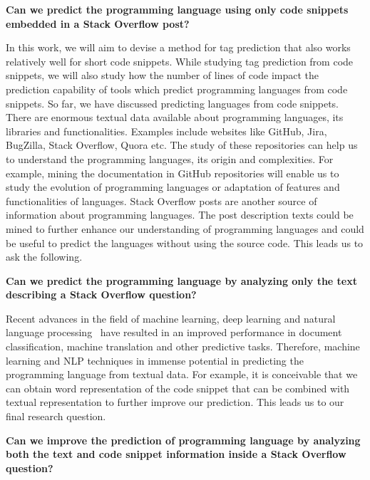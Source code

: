 \documentclass[letterpaper, 10 pt, conference]{ieeeconf}  %
\begin{document}
 
\begin{theo}
\textbf{Can we predict the programming language using only code snippets embedded in a Stack Overflow post?}
\end{theo}
 

In this work, we will aim to devise a method for tag prediction that also works relatively well for short code snippets. While studying tag prediction from code snippets, we will also study how the number of lines of code impact the prediction capability of tools which predict programming languages from code snippets. So far, we have discussed predicting languages from code snippets. There are enormous textual data available about programming languages, its libraries and functionalities. Examples include websites like GitHub, Jira, BugZilla, Stack Overflow, Quora etc. The study of these repositories can help us to understand the programming languages, its origin and complexities. For example, mining the documentation in GitHub repositories will enable us to study the evolution of programming languages or adaptation of features and functionalities of languages. Stack Overflow posts are another source of information about programming languages. The post description texts could be mined to further enhance our understanding of programming languages and could be useful to predict the languages without using the source code. This leads us to ask the following.

 
\begin{theo}
\textbf{Can we predict the programming language by analyzing only the text describing a Stack Overflow question?}
\end{theo}
 

Recent advances in the field of machine learning, deep learning and natural language processing~\cite{c13} have resulted in an improved performance in document classification, machine translation and other predictive tasks. Therefore, machine learning and NLP techniques in immense potential in predicting the programming language from textual data. For example, it is conceivable that we can obtain word representation of the code snippet that can be combined with textual representation to further improve our prediction. This leads us to our final research question.

 
\begin{theo}
\textbf{Can we improve the prediction of programming language by analyzing both the text and code snippet information inside a Stack Overflow question?}
\end{theo}
 
\end{document}
